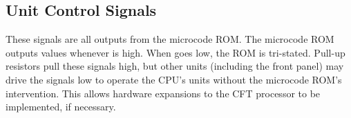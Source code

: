 

\subsection{Unit Control Signals}

These signals are all outputs from the microcode ROM. The microcode
ROM outputs values whenever \HALT{} is high. When \HALT{} goes low, the
ROM is tri-stated. Pull-up resistors pull these signals high, but
other units (including the front panel) may drive the signals low to
operate the CPU's units without the microcode ROM's intervention. This
allows hardware expansions to the CFT processor to be implemented, if
necessary.

